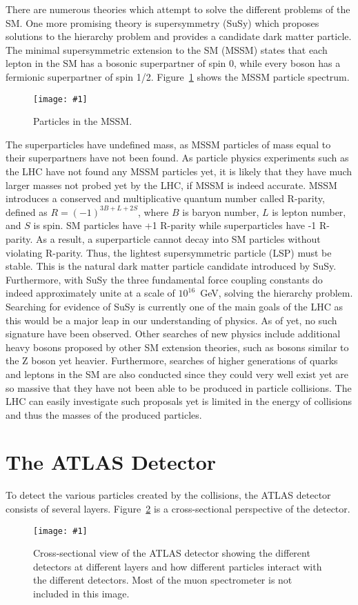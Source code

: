 \documentclass[twocolumn]{article}
\newcommand{\insertFigure}[1]{%
   \texttt{[image: \#1]}%
}
\begin{document}
\par There are numerous theories which attempt to solve the different problems of the SM. One more promising theory is supersymmetry (SuSy) which proposes solutions to the hierarchy problem and provides a candidate dark matter particle. The minimal supersymmetric extension to the SM (MSSM) states that each lepton in the SM has a bosonic superpartner of spin 0, while every boson has a fermionic superpartner of spin 1/2. Figure~\ref{fig:susy} shows the MSSM particle spectrum.
\begin{figure}[!h]
	\centering
	\insertFigure{Images/susy.png}
	\caption{Particles in the MSSM.~\cite{susy}}
	\label{fig:susy}
\end{figure}
The superparticles have undefined mass, as MSSM particles of mass equal to their superpartners have not been found. As particle physics experiments such as the LHC have not found any MSSM particles yet, it is likely that they have much larger masses not probed yet by the LHC, if MSSM is indeed accurate. MSSM introduces a conserved and multiplicative quantum number called R-parity, defined as $R = (-1)^{3B+L+2S}$, where $B$ is baryon number, $L$ is lepton number, and $S$ is spin. SM particles have +1 R-parity while superparticles have -1 R-parity. As a result, a superparticle cannot decay into SM particles without violating R-parity. Thus, the lightest supersymmetric particle (LSP) must be stable. This is the natural dark matter particle candidate introduced by SuSy. Furthermore, with SuSy the three fundamental force coupling constants do indeed approximately unite at a scale of $10^{16}$~GeV, solving the hierarchy problem. Searching for evidence of SuSy is currently one of the main goals of the LHC as this would be a major leap in our understanding of physics. As of yet, no such signature have been observed. Other searches of new physics include additional heavy bosons proposed by other SM extension theories, such as bosons similar to the Z boson yet heavier. Furthermore, searches of higher generations of quarks and leptons in the SM are also conducted since they could very well exist yet are so massive that they have not been able to be produced in particle collisions. The LHC can easily investigate such proposals yet is limited in the energy of collisions and thus the masses of the produced particles.

\section{The ATLAS Detector}\label{sec:Exp}
To detect the various particles created by the collisions, the ATLAS detector consists of several layers. Figure~\ref{fig:ATLAS} is a cross-sectional perspective of the detector. 
\begin{figure}[!h]
	\centering
	\insertFigure{Images/ATLAS.png}
	\caption{Cross-sectional view of the ATLAS detector showing the different detectors at different layers and how different particles interact with the different detectors. Most of the muon spectrometer is not included in this image.~\cite{manual}}
	\label{fig:ATLAS}
\end{figure}
\end{document}

